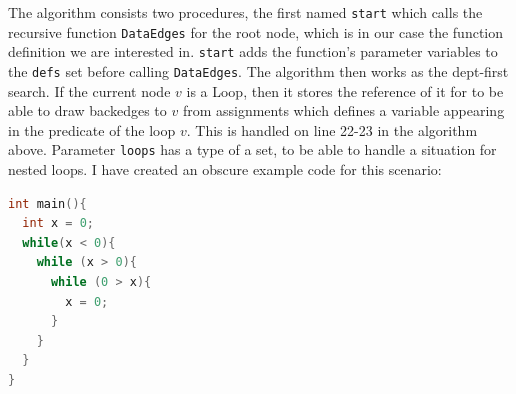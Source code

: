 \documentclass[oneside,12pt,a4paper]{book}
\begin{document}
The algorithm consists two procedures, the first named \texttt{start} which calls the recursive function \texttt{DataEdges} for the root node, which is in our case the function definition we are interested in. \texttt{start} adds the function's parameter variables to the \texttt{defs} set before calling \texttt{DataEdges}. The algorithm then works as the dept-first search. If the current node $v$ is a Loop, then it stores the reference of it for to be able to draw backedges to $v$ from assignments which defines a variable appearing in the predicate of the loop $v$. This is handled on line 22-23 in the algorithm above. Parameter \texttt{loops} has a type of a set, to be able to handle a situation for nested loops.
I have created an obscure example code for this scenario:
\begin{minipage}[c]{0.5\textwidth}
\lstset{numbers=left}
\begin{lstlisting}[language=C++]
int main(){
  int x = 0;
  while(x < 0){
    while (x > 0){
      while (0 > x){
        x = 0;
      }
    }
  }
}
\end{lstlisting}
\end{minipage}%
\end{document}
